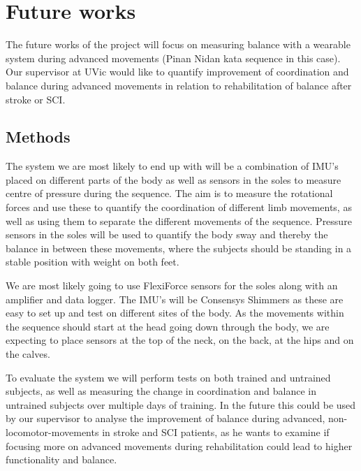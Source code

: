 \section{Future works}

The future works of the project will focus on measuring balance with a wearable system during advanced movements (Pinan Nidan kata sequence in this case). Our supervisor at UVic would like to quantify improvement of coordination and balance during advanced movements in relation to rehabilitation of balance after stroke or SCI.

\subsection{Methods}

The system we are most likely to end up with will be a combination of IMU's placed on different parts of the body as well as sensors in the soles to measure centre of pressure during the sequence. The aim is to measure the rotational forces and use these to quantify the coordination of different limb movements, as well as using them to separate the different movements of the sequence. Pressure sensors in the soles will be used to quantify the body sway and thereby the balance in between these movements, where the subjects should be standing in a stable position with weight on both feet. 

We are most likely going to use FlexiForce sensors for the soles along with an amplifier and data logger. The IMU's will be Consensys Shimmers as these are easy to set up and test on different sites of the body. As the movements within the sequence should start at the head going down through the body, we are expecting to place sensors at the top of the neck, on the back, at the hips and on the calves. 

To evaluate the system we will perform tests on both trained and untrained subjects, as well as measuring the change in coordination and balance in untrained subjects over multiple days of training. In the future this could be used by our supervisor to analyse the improvement of balance during advanced, non-locomotor-movements in stroke and SCI patients, as he wants to examine if focusing more on advanced movements during rehabilitation could lead to higher functionality and balance. 